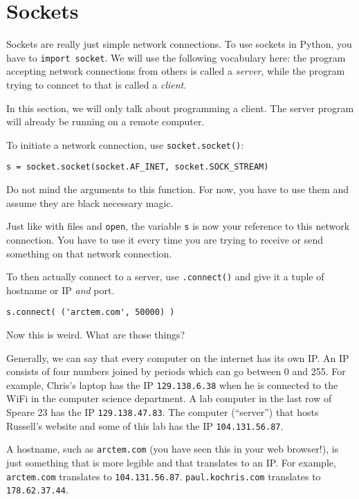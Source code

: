 \documentclass[11pt]{cselabheader}
\begin{document}
\pagebreak
\section{Sockets}
\label{sec:sock}

Sockets are really just simple network connections. To use sockets in Python,
you have to \lstinline!import socket!. We will use the following vocabulary
here: the program accepting network connections from others is called a
\emph{server}, while the program trying to conncet to that is called a
\emph{client}.

In this section, we will only talk about programming a client. The server
program will already be running on a remote computer.

To initiate a network connection, use \lstinline!socket.socket()!:
\begin{lstlisting}
s = socket.socket(socket.AF_INET, socket.SOCK_STREAM)
\end{lstlisting}

Do not mind the arguments to this function. For now, you have to use them and
assume they are black necessary magic.

Just like with files and \lstinline!open!, the variable \lstinline!s! is now
your reference to this network connection. You have to use it every time you are
trying to receive or send something on that network connection.

To then actually connect to a server, use \lstinline!.connect()! and give it a
tuple of hostname or IP \emph{and} port.
\begin{lstlisting}
s.connect( ('arctem.com', 50000) )
\end{lstlisting}
Now this is weird. What are those things? 

Generally, we can say that every computer on the internet has its own IP. An IP
consists of four numbers joined by periods which can go between 0 and 255. For
example, Chris's laptop has the IP \texttt{129.138.6.38} when he is connected to
the WiFi in the computer science department. A lab computer in the last row of 
Speare 23 has the IP \texttt{129.138.47.83}. The computer (``server'') that
hosts Russell's website and some of this lab has the IP \texttt{104.131.56.87}.

A hostname, such as \texttt{arctem.com} (you have seen this in your web
browser!), is just something that is more legible and that translates to an IP.
For example, \texttt{arctem.com} translates to \texttt{104.131.56.87}.
\texttt{paul.kochris.com} translates to \texttt{178.62.37.44}.
\end{document}
